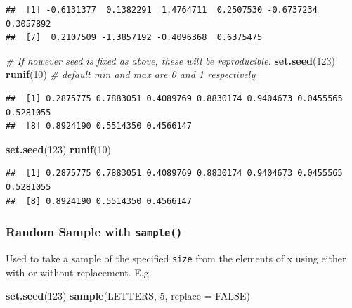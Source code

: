 \documentclass[
]{book}
\newenvironment{Shaded}{\begin{snugshade}}{\end{snugshade}}
\newcommand{\AttributeTok}[1]{\textcolor[rgb]{0.13,0.29,0.53}{#1}}
\newcommand{\CommentTok}[1]{\textcolor[rgb]{0.56,0.35,0.01}{\textit{#1}}}
\newcommand{\ConstantTok}[1]{\textcolor[rgb]{0.56,0.35,0.01}{#1}}
\newcommand{\DecValTok}[1]{\textcolor[rgb]{0.00,0.00,0.81}{#1}}
\newcommand{\FunctionTok}[1]{\textcolor[rgb]{0.13,0.29,0.53}{\textbf{#1}}}
\newcommand{\NormalTok}[1]{#1}
\begin{document}
\begin{verbatim}
##  [1] -0.6131377  0.1382291  1.4764711  0.2507530 -0.6737234  0.3057892
##  [7]  0.2107509 -1.3857192 -0.4096368  0.6375475
\end{verbatim}

\begin{Shaded}
\begin{Highlighting}[]
\CommentTok{\# If however seed is fixed as above, these will be reproducible.}
\FunctionTok{set.seed}\NormalTok{(}\DecValTok{123}\NormalTok{)}
\FunctionTok{runif}\NormalTok{(}\DecValTok{10}\NormalTok{) }\CommentTok{\# default min and max are 0 and 1 respectively}
\end{Highlighting}
\end{Shaded}

\begin{verbatim}
##  [1] 0.2875775 0.7883051 0.4089769 0.8830174 0.9404673 0.0455565 0.5281055
##  [8] 0.8924190 0.5514350 0.4566147
\end{verbatim}

\begin{Shaded}
\begin{Highlighting}[]
\FunctionTok{set.seed}\NormalTok{(}\DecValTok{123}\NormalTok{)}
\FunctionTok{runif}\NormalTok{(}\DecValTok{10}\NormalTok{)}
\end{Highlighting}
\end{Shaded}

\begin{verbatim}
##  [1] 0.2875775 0.7883051 0.4089769 0.8830174 0.9404673 0.0455565 0.5281055
##  [8] 0.8924190 0.5514350 0.4566147
\end{verbatim}

\hypertarget{random-sample-with-sample}{%
\subsubsection*{\texorpdfstring{Random Sample with \texttt{sample()}}{Random Sample with sample()}}\label{random-sample-with-sample}}

Used to take a sample of the specified \texttt{size} from the elements of x using either with or without replacement. E.g.

\begin{Shaded}
\begin{Highlighting}[]
\FunctionTok{set.seed}\NormalTok{(}\DecValTok{123}\NormalTok{)}
\FunctionTok{sample}\NormalTok{(LETTERS, }\DecValTok{5}\NormalTok{, }\AttributeTok{replace =} \ConstantTok{FALSE}\NormalTok{)}
\end{Highlighting}
\end{Shaded}
\end{document}
